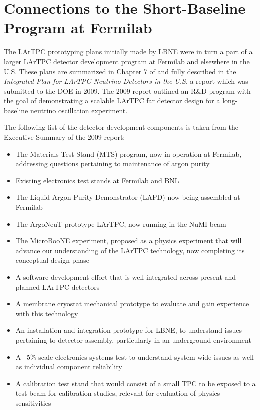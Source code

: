 \section{Connections to the Short-Baseline Program at Fermilab}
\label{sec:sbn_connect}

The LArTPC prototyping plans initially made by LBNE were in turn a part of a larger LArTPC detector development program at Fermilab and elsewhere in the U.S.  These plans are summarized in Chapter 7 of \anxlbnefd and fully described in the \textit{Integrated Plan for LArTPC Neutrino Detectors in the U.S}, a report which was submitted to the DOE in 2009.  
The 2009 report outlined an R\&D program with the goal of demonstrating a scalable LArTPC far detector design for a long-baseline neutrino oscillation experiment.  

The following list of the detector development components is taken from the Executive Summary of the 2009 report:
\begin{itemize}
   \item The Materials Test Stand (MTS) program, now in operation at Fermilab, addressing questions pertaining to maintenance of argon purity
    \item Existing electronics test stands at Fermilab and BNL
    \item The Liquid Argon Purity Demonstrator (LAPD) now being assembled at Fermilab
    \item The ArgoNeuT prototype LArTPC, now running in the NuMI beam
    \item The MicroBooNE experiment, proposed as a physics experiment that will advance our understanding of the LArTPC technology, now completing its conceptual design phase
    \item A software development effort that is well integrated across present and planned LArTPC detectors
    \item A membrane cryostat mechanical prototype to evaluate and gain experience with this technology
    \item An installation and integration prototype for LBNE, to understand issues pertaining to detector assembly, particularly in an underground environment
    \item A ~5\% scale electronics systems test to understand system-wide issues as well as individual component reliability
    \item A calibration test stand that would consist of a small TPC to be exposed to a test beam for calibration studies, relevant for evaluation of physics sensitivities   
\end{itemize}

